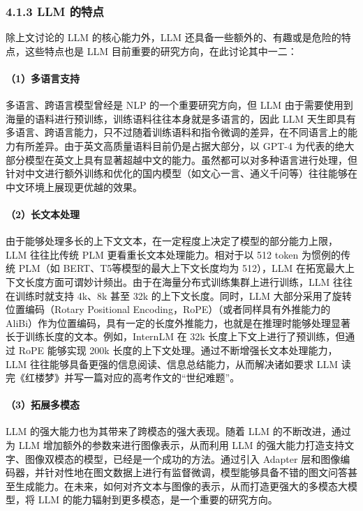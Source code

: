 \documentclass[12pt,a4paper]{book}
\begin{document}
\subsubsection{4.1.3 LLM 的特点}\label{llm-ux7684ux7279ux70b9}

除上文讨论的 LLM 的核心能力外，LLM
还具备一些额外的、有趣或是危险的特点，这些特点也是 LLM
目前重要的研究方向，在此讨论其中一二：

\paragraph{（1）多语言支持}\label{ux591aux8bedux8a00ux652fux6301}

多语言、跨语言模型曾经是 NLP 的一个重要研究方向，但 LLM
由于需要使用到海量的语料进行预训练，训练语料往往本身就是多语言的，因此
LLM
天生即具有多语言、跨语言能力，只不过随着训练语料和指令微调的差异，在不同语言上的能力有所差异。由于英文高质量语料目前仍是占据大部分，以
GPT-4
为代表的绝大部分模型在英文上具有显著超越中文的能力。虽然都可以对多种语言进行处理，但针对中文进行额外训练和优化的国内模型（如文心一言、通义千问等）往往能够在中文环境上展现更优越的效果。

\paragraph{（2）长文本处理}\label{ux957fux6587ux672cux5904ux7406}

由于能够处理多长的上下文文本，在一定程度上决定了模型的部分能力上限，LLM
往往比传统 PLM 更看重长文本处理能力。相对于以 512 token 为惯例的传统
PLM（如 BERT、T5等模型的最大上下文长度均为 512），LLM
在拓宽最大上下文长度方面可谓妙计频出。由于在海量分布式训练集群上进行训练，LLM
往往在训练时就支持 4k、8k 甚至 32k 的上下文长度。同时，LLM
大部分采用了旋转位置编码（Rotary Positional
Encoding，RoPE）（或者同样具有外推能力的
AliBi）作为位置编码，具有一定的长度外推能力，也就是在推理时能够处理显著长于训练长度的文本。例如，InternLM
在 32k 长度上下文上进行了预训练，但通过 RoPE 能够实现 200k
长度的上下文处理。通过不断增强长文本处理能力，LLM
往往能够具备更强的信息阅读、信息总结能力，从而解决诸如要求 LLM
读完《红楼梦》并写一篇对应的高考作文的``世纪难题''。

\paragraph{（3）拓展多模态}\label{ux62d3ux5c55ux591aux6a21ux6001}

LLM 的强大能力也为其带来了跨模态的强大表现。随着 LLM 的不断改进，通过为
LLM 增加额外的参数来进行图像表示，从而利用 LLM
的强大能力打造支持文字、图像双模态的模型，已经是一个成功的方法。通过引入
Adapter
层和图像编码器，并针对性地在图文数据上进行有监督微调，模型能够具备不错的图文问答甚至生成能力。在未来，如何对齐文本与图像的表示，从而打造更强大的多模态大模型，将
LLM 的能力辐射到更多模态，是一个重要的研究方向。
\end{document}
